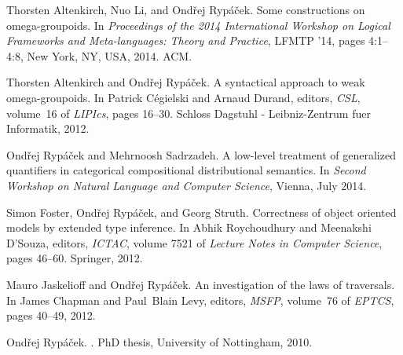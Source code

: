 \documentclass[a4paper]{article}
\begin{document}



\newpage
\renewcommand{\refname}{{\large List of All Papers}}
\begin{thebibliography}{RBN06}
Thorsten Altenkirch, Nuo Li, and Ond\v{r}ej Ryp\'{a}\v{c}ek.
\newblock Some constructions on omega-groupoids.
\newblock In {\em Proceedings of the 2014 International Workshop on Logical
  Frameworks and Meta-languages: Theory and Practice}, LFMTP '14, pages
  4:1--4:8, New York, NY, USA, 2014. ACM.

Thorsten Altenkirch and Ond\v{r}ej Ryp\'a\v{c}ek.
\newblock A syntactical approach to weak omega-groupoids.
\newblock In Patrick C{\'e}gielski and Arnaud Durand, editors, {\em CSL},
  volume~16 of {\em LIPIcs}, pages 16--30. Schloss Dagstuhl - Leibniz-Zentrum
  fuer Informatik, 2012.

Ond\v{r}ej Ryp\'a\v{c}ek and Mehrnoosh Sadrzadeh.
\newblock A low-level treatment of generalized quantifiers in categorical
  compositional distributional semantics.
\newblock In {\em Second Workshop on Natural Language and Computer Science},
  Vienna, July 2014.

Simon Foster, Ond\v{r}ej Ryp\'a\v{c}ek, and Georg Struth.
\newblock Correctness of object oriented models by extended type inference.
\newblock In Abhik Roychoudhury and Meenakshi D'Souza, editors, {\em ICTAC},
  volume 7521 of {\em Lecture Notes in Computer Science}, pages 46--60.
  Springer, 2012.

Mauro Jaskelioff and Ond\v{r}ej Ryp\'a\v{c}ek.
\newblock An investigation of the laws of traversals.
\newblock In James Chapman and Paul~Blain Levy, editors, {\em MSFP}, volume~76
  of {\em EPTCS}, pages 40--49, 2012.

Ond\v{r}ej Ryp\'{a}\v{c}ek.
.
\newblock PhD thesis, University of Nottingham, 2010.



\end{thebibliography}
\end{document}

